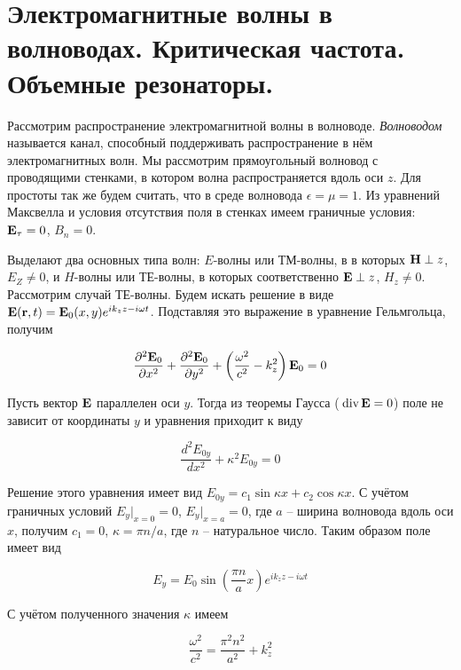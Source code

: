 \section{Электромагнитные волны в волноводах. Критическая частота. Объемные резонаторы.}

Рассмотрим распространение электромагнитной волны в волноводе. \textit{Волноводом} называется канал, способный поддерживать распространение в нём электромагнитных волн. Мы рассмотрим прямоугольный волновод с проводящими стенками, в котором волна распространяется вдоль оси $z$. Для простоты так же будем считать, что в среде волновода $\epsilon = \mu = 1$. Из уравнений Максвелла и условия отсутствия поля в стенках имеем граничные условия: $\mathbf E_\tau = 0$, $B_n = 0$.

Выделают два основных типа волн: $E$-волны или ТМ-волны, в в которых $\mathbf H \perp z$, $E_Z \neq 0$, и $H$-волны или ТЕ-волны, в которых соответственно $\mathbf E \perp z$, $H_z \neq 0$. Рассмотрим случай ТЕ-волны. Будем искать решение в виде $\mathbf E(\mathbf r, t) = \mathbf E_0 (x, y) e^{i k_z z - i \omega t}$. Подставляя это выражение в уравнение Гельмгольца, получим

\begin{equation}
    \frac{\partial^2 \mathbf E_0}{\partial x^2} + \frac{\partial^2 \mathbf E_0}{\partial y^2} + \left( \frac{\omega^2}{c^2} - k_z^2 \right) \mathbf E_0 = 0
\end{equation}

Пусть вектор $\mathbf E$ параллелен оси $y$. Тогда из теоремы Гаусса ($\, \text{div} \, \mathbf E = 0$) поле не зависит от координаты $y$ и уравнения приходит к виду

\begin{equation}
    \frac{d^2 E_{0 y}}{d x^2} + \kappa^2 E_{0 y} = 0
\end{equation}

\noindent
Решение этого уравнения имеет вид $E_{0 y} = c_1 \sin \kappa x + c_2 \cos \kappa x$. С учётом граничных условий $E_y |_{x = 0} = 0$, $E_y |_{x = a} = 0$, где $a$ -- ширина волновода вдоль оси $x$, получим $c_1 = 0$, $\kappa = \pi n / a$, где $n$ -- натуральное число. Таким образом поле имеет вид

\begin{equation}
    E_y = E_0 \sin \left( \frac{\pi n}{a} x \right) e^{i k_z z - i \omega t}
\end{equation}

\noindent
С учётом полученного значения $\kappa$ имеем

\begin{equation}
    \frac{\omega^2}{c^2} = \frac{\pi^2 n^2}{a^2} + k_z^2
\end{equation}

